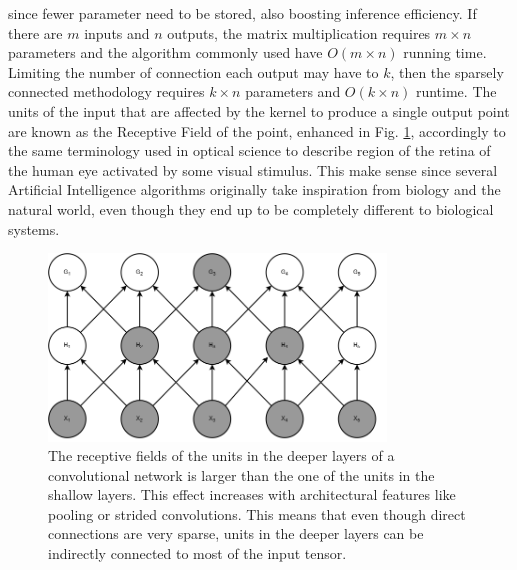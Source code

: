 \documentclass[binding=0.7cm, oneside]{sapthesis}
\begin{document}
since fewer parameter need to be stored, also boosting inference efficiency. If there are $m$ inputs and $n$ outputs, the matrix multiplication requires $m \times n$ parameters and the algorithm commonly used have $O(m \times n)$ running time.
Limiting the number of connection each output may have to $k$, then the sparsely connected methodology requires $k \times n$ parameters and $O(k \times n)$ runtime. The units of the input that are affected by the kernel to produce a single output point are known as
the Receptive Field of the point, enhanced in Fig. \ref{fig:rec_field}, accordingly to the same terminology used in optical science to describe region of the retina of the human eye activated by some visual stimulus. This make sense since several Artificial Intelligence algorithms originally take inspiration
from biology and the natural world, even though they end up to be completely different to biological systems.

\begin{figure}[h]
    \centering
    \includegraphics[width=0.8\textwidth]{images/convfield3.png}
    \caption{The receptive fields of the units in the deeper layers of a convolutional network is larger than the one of the units in the shallow layers.
        This effect increases with architectural features like pooling or strided convolutions. This means that even though direct connections are very sparse,
        units in the deeper layers \cite{rec_field} can be indirectly connected to most of the input tensor.}
    \label{fig:rec_field}
\end{figure}
\end{document}
